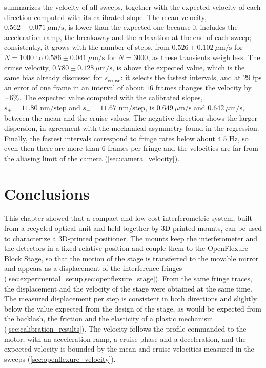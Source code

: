  summarizes the velocity of all sweeps, together with the expected velocity of each direction computed with its calibrated slope. The mean velocity, $0.562 \pm 0.071\ \mu\text{m/s}$, is lower than the expected one because it includes the acceleration ramp, the breakaway and the relaxation at the end of each sweep; consistently, it grows with the number of steps, from $0.526 \pm 0.102\ \mu\text{m/s}$ for $N = 1000$ to $0.586 \pm 0.041\ \mu\text{m/s}$ for $N = 3000$, as these transients weigh less. The cruise velocity, $0.780 \pm 0.128\ \mu\text{m/s}$, is above the expected value, which is the same bias already discussed for $s_{\text{cruise}}$: it selects the fastest intervals, and at $29\text{ fps}$ an error of one frame in an interval of about $16$ frames changes the velocity by $\sim 6\%$. The expected value computed with the calibrated slopes, $s_+ = 11.80\text{ nm/step}$ and $s_- = 11.67\text{ nm/step}$, is $0.649\ \mu\text{m/s}$ and $0.642\ \mu\text{m/s}$, between the mean and the cruise values. The negative direction shows the larger dispersion, in agreement with the mechanical asymmetry found in the regression. Finally, the fastest intervals correspond to fringe rates below about $4.5\text{ Hz}$, so even then there are more than $6$ frames per fringe and the velocities are far from the aliasing limit of the camera (\cref{sec:camera_velocity}).

\section{Conclusions}
\label{sec:setup_conclusions}

This chapter showed that a compact and low-cost interferometric system, built from a recycled optical unit and held together by 3D-printed mounts, can be used to characterize a 3D-printed positioner. The mounts keep the interferometer and the detectors in a fixed relative position and couple them to the OpenFlexure Block Stage, so that the motion of the stage is transferred to the movable mirror and appears as a displacement of the interference fringes (\cref{sec:experimental_setup,sec:openflexure_stage}). From the same fringe traces, the displacement and the velocity of the stage were obtained at the same time. The measured displacement per step is consistent in both directions and slightly below the value expected from the design of the stage, as would be expected from the backlash, the friction and the elasticity of a plastic mechanism (\cref{sec:calibration_results}). The velocity follows the profile commanded to the motor, with an acceleration ramp, a cruise phase and a deceleration, and the expected velocity is bounded by the mean and cruise velocities measured in the sweeps (\cref{sec:openflexure_velocity}).


